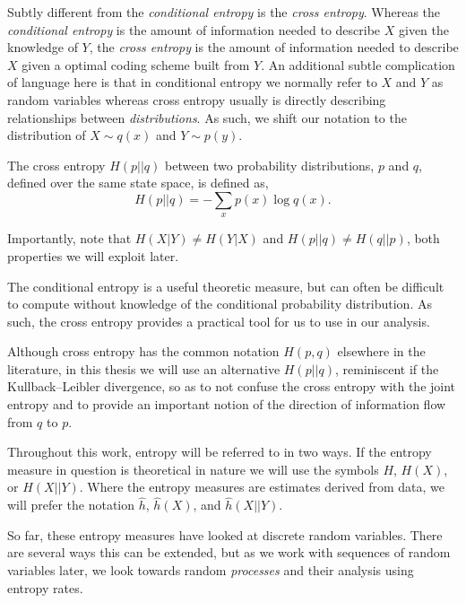 Subtly different from the \emph{conditional entropy} is the \emph{cross entropy}. Whereas the \emph{conditional entropy} is the amount of information needed to describe $X$ given the knowledge of $Y$, the \emph{cross entropy} is the amount of information needed to describe $X$ given a optimal coding scheme built from $Y$. An additional subtle complication of language here is that in conditional entropy we normally refer to $X$ and $Y$ as random variables whereas cross entropy usually is directly describing relationships between \emph{distributions}. As such, we shift our notation to the distribution of $X \sim q(x)$ and $Y \sim p(y)$.

\begin{definition}\label{def:crossentropy}
	The cross entropy $H(p||q)$ between two probability distributions, $p$ and $q$, defined over the same state space, is defined as, 
	\begin{equation}
	H (p||q)= - \sum_{x} p(x) \log {q(x)}.
	\end{equation}
\end{definition}

\begin{remark}
	Importantly, note that $H(X|Y) \neq  H(Y|X)$ and $H(p||q) \neq H (q||p)$, both properties we will exploit later.
\end{remark}

The conditional entropy is a useful theoretic measure, but can often be difficult to compute without knowledge of the conditional probability distribution. As such, the cross entropy provides a practical tool for us to use in our analysis.

Although cross entropy has the common notation $H(p, q)$ elsewhere in the literature, in this thesis we will use an alternative $H(p||q)$, reminiscent if the Kullback–Leibler divergence, so as to not confuse the cross entropy with the joint entropy and to provide an important notion of the direction of information flow from $q$ to $p$.

Throughout this work, entropy will be referred to in two ways. If the entropy measure in question is theoretical in nature we will use the symbols $H$, $H(X)$, or $H(X||Y)$. Where the entropy measures are estimates derived from data, we will prefer the notation $\hat{h}$, $\hat{h}(X)$, and $\hat{h}(X||Y)$. 


So far, these entropy measures have looked at discrete random variables. There are several ways this can be extended, but as we work with sequences of random variables later, we look towards random \emph{processes} and their analysis using entropy rates.

